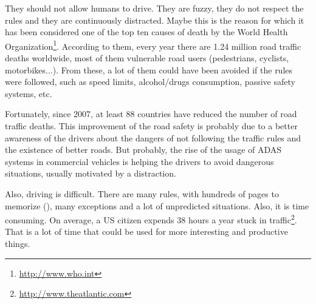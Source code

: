 
\graphicspath{{./images/chapter00/bmps/}{./images/chapter00/vects/}{./images/chapter00/}}

\label{ch:chapter00}


They should not allow humans to drive. They are fuzzy, they do not respect the rules and they are continuously distracted. Maybe this is the reason for which it has been considered one of the top ten causes of death by the World Health Organization\footnote{\href{http://www.who.int/features/factfiles/roadsafety/en/}{http://www.who.int}}. According to them, every year there are 1.24 million road traffic deaths worldwide, most of them vulnerable road users (pedestrians, cyclists, motorbikes...). From these, a lot of them could have been avoided if the rules were followed, such as speed limits, alcohol/drugs consumption, passive safety systems, etc. 

Fortunately, since 2007, at least 88 countries have reduced the number of road traffic deaths. This improvement of the road safety is probably due to a better awareness of the drivers about the dangers of not following the traffic rules and the existence of better roads. But probably, the rise of the usage of \ac{ADAS} systems in commercial vehicles is helping the drivers to avoid dangerous situations, usually motivated by a distraction.

Also, driving is difficult. There are many rules, with hundreds of pages to memorize (\cite{schwarzenegger2007california}), many exceptions and a lot of unpredicted situations. Also, it is time consuming. On average, a US citizen expends 38 hours a year stuck in traffic\footnote{\href{http://www.theatlantic.com/business/archive/2013/02/the-american-commuter-spends-38-hours-a-year-stuck-in-traffic/272905}{http://www.theatlantic.com}}. That is a lot of time that could be used for more interesting and productive things.

